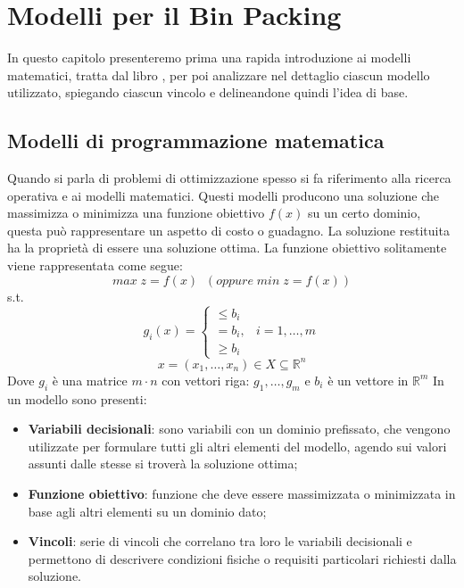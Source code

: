 
\hypertarget{(chap:capitolo4)}{}
\chapter{Modelli per il Bin Packing}
In questo capitolo presenteremo prima una rapida introduzione ai modelli matematici, tratta dal libro , per poi analizzare nel dettaglio ciascun modello utilizzato, spiegando ciascun vincolo e delineandone quindi l'idea di base.
\section{Modelli di programmazione matematica}
Quando si parla di problemi di ottimizzazione spesso si fa riferimento alla ricerca operativa e ai modelli matematici. Questi modelli producono una soluzione che massimizza o minimizza una funzione obiettivo $f ( x ) $ su un certo dominio, questa può rappresentare un aspetto di costo o guadagno.
La soluzione restituita ha la proprietà di essere una soluzione ottima. La funzione obiettivo solitamente viene rappresentata come segue:
$$ max\; z = f ( x )\;\; (oppure\; min\; z = f ( x ))$$
s.t.
$$g_i (x) = \begin{cases} \leq b_i \\ = b_i, & i = 1,\dots,m \\ \geq b_i \end{cases}$$
$$x = (x_1,\dots,x_n) \in X \subseteq \mathbb{R}^n$$
Dove $g_i$ è una matrice $m \cdot n$ con vettori riga: $g_1,\dots,g_m$ e $b_i$ è un vettore in $\mathbb{R}^{m}$
In un modello sono presenti:
\begin{itemize}
	\item \textbf{Variabili decisionali}: sono variabili con un dominio prefissato, che vengono utilizzate per formulare tutti gli altri elementi del modello, agendo sui valori assunti dalle stesse si troverà la soluzione ottima;
	\item \textbf{Funzione obiettivo}: funzione che deve essere massimizzata o minimizzata in base agli altri elementi su un dominio dato;
	\item \textbf{Vincoli}: serie di vincoli che correlano tra loro le variabili decisionali e permettono di descrivere condizioni fisiche o requisiti particolari richiesti dalla soluzione.
\end{itemize}
